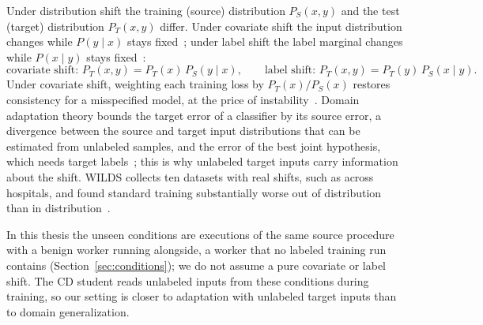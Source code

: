 Under distribution shift the training (source) distribution
$P_S(x,y)$ and the test (target) distribution $P_T(x,y)$ differ. Under
covariate shift the input distribution changes while $P(y\mid x)$ stays
fixed~\cite{sugiyama2007covariate}; under label shift the label marginal
changes while $P(x\mid y)$ stays fixed~\cite{lipton2018detecting}:
\begin{equation}
  \text{covariate shift: } P_T(x,y)=P_T(x)\,P_S(y\mid x),
  \qquad
  \text{label shift: } P_T(x,y)=P_T(y)\,P_S(x\mid y) .
  \label{eq:bg-shift-types}
\end{equation}
Under covariate shift, weighting each training loss by $P_T(x)/P_S(x)$
restores consistency for a misspecified model, at the price of
instability~\cite{sugiyama2007covariate}. Domain adaptation theory
bounds the target error of a classifier by its source error, a
divergence between the source and target input distributions that can
be estimated from unlabeled samples, and the error of the best joint
hypothesis, which needs target labels~\cite{bendavid2010theory}; this is
why unlabeled target inputs carry information about the shift. WILDS
collects ten datasets with real shifts, such as across hospitals, and
found standard training substantially worse out of distribution than in
distribution~\cite{koh2021wilds}.

In this thesis the unseen conditions are executions of the same source
procedure with a benign worker running alongside, a worker that no
labeled training run contains (Section~\ref{sec:conditions}); we do not
assume a pure covariate or label shift. The CD student reads unlabeled
inputs from these conditions during training, so our setting is closer
to adaptation with unlabeled target inputs than to domain
generalization.
